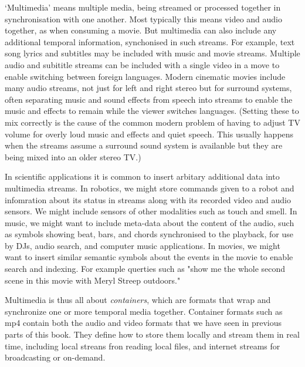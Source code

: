 \documentclass[oneside,english]{scrbook}
\begin{document}
`Multimedia' means multiple media, being streamed or processed together in synchronisation with one another.  Most typically this means video and audio together, as when consuming a movie.   But multimedia can also include any additional temporal information, synchonised in such streams.   For example, text song lyrics and subtitles may be included with music and movie streams.   Multiple audio and subititle streams can be included with a single video in a move to enable switching between foreign languages.   Modern cinematic movies include many audio streams, not just for left and right stereo but for surround systems, often separating music and sound effects from speech into streams to enable the music and effects to remain while the viewer switches languages.   (Setting these to mix correctly is the cause of the common modern problem of having to adjust TV volume for overly loud music and effects and quiet speech. This usually happens when the streams assume a surround sound system is availanble but they are being mixed into an older stereo TV.)

In scientific applications it is common to insert arbitary additional data into multimedia streams. In robotics, we might store commands given to a robot and infomration about its status in streams along with its recorded video and audio sensors.   We might include sensors of other modalities such as touch and smell.   In music, we might want to include meta-data about the content of the audio, such as symbols showing beat, bars, and chords synchronised to the playback, for use by DJs, audio search, and computer music applications.   In movies, we might want to insert similar semantic symbols about the events in the movie to enable search and indexing. For example querties such as "show me the whole second scene in this movie with Meryl Streep outdoors."

Multimedia is thus all about {\em containers}, which are formats that wrap and synchronize one or more temporal media together.  Container formats such as mp4 contain both the audio and video formats that we have seen in previous parts of this book.   They define how to store them locally and stream them in real time, including local streans fron reading local files, and internet streams for broadcasting or on-demand.
\end{document}
